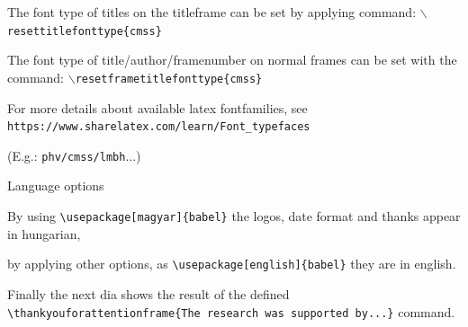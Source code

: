 \documentclass{beamer}
\begin{document}
\begin{frame}

    The font type of titles on the titleframe can be set by applying command:
    \texttt{$\backslash$resettitlefonttype\{cmss\}}
    
    \vspace{10mm}
    
    The font type of title/author/framenumber on normal frames can be set with the command:
    \texttt{$\backslash$resetframetitlefonttype\{cmss\}}
    
    
    \vspace{10mm}
    
    For more details about available latex fontfamilies, see \texttt{https://www.sharelatex.com/learn/Font\_typefaces}
    
    (E.g.: \texttt{phv/cmss/lmbh}...)
    
    \showfootline
    
    \showlogo
\end{frame}
	
	\begin{frame}{Language options}
		
		By using \texttt{\textbackslash usepackage[magyar]\{babel\}} the logos, date format and thanks appear in hungarian, 
		
		\vspace{3mm}
		
		by applying other options, as \texttt{\textbackslash usepackage[english]\{babel\}} they are in english.
		
		\vspace{8mm}
		
		Finally the next dia shows the result of the defined \texttt{\textbackslash thankyouforattentionframe\{The research was supported by...\}} command.
		
	\end{frame}

	
\end{document}
